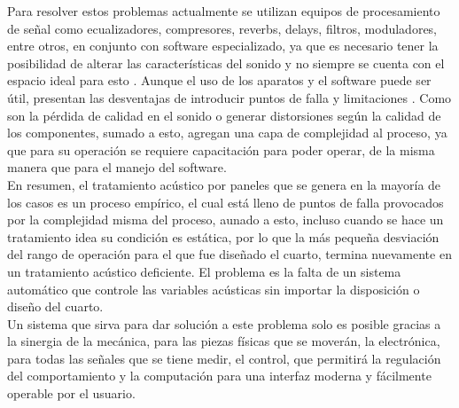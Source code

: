 Para resolver estos problemas actualmente se utilizan equipos de procesamiento de señal como ecualizadores, compresores, reverbs, delays, filtros, moduladores, entre otros, en conjunto con software especializado, ya que es necesario tener la posibilidad de alterar las características del sonido y no siempre se cuenta con el espacio ideal para esto \cite{Pack}. Aunque el uso de los aparatos y el software puede ser útil, presentan las desventajas de introducir puntos de falla y limitaciones \cite{E-Home}. Como son la pérdida de calidad en el sonido o generar distorsiones según la calidad de los componentes, sumado a esto, agregan una capa de complejidad al proceso, ya que para su operación se requiere capacitación para poder operar, de la misma manera que para el manejo del software.
\\
En resumen, el tratamiento acústico por paneles que se genera en la mayoría de los casos es un proceso empírico, el cual está lleno de puntos de falla provocados por la complejidad misma del proceso, aunado a esto, incluso cuando se hace un tratamiento idea su condición es estática, por lo que la más pequeña desviación del rango de operación para el que fue diseñado el cuarto, termina nuevamente en un tratamiento acústico deficiente. El problema es la falta de un sistema automático que controle las variables acústicas sin importar la disposición o diseño del cuarto.
\\
Un sistema que sirva para dar solución a este problema solo es posible gracias a la sinergia de la mecánica, para las piezas físicas que se moverán, la electrónica, para todas las señales que se tiene medir, el control, que permitirá la regulación del comportamiento y la computación para una interfaz moderna y fácilmente operable por el usuario.